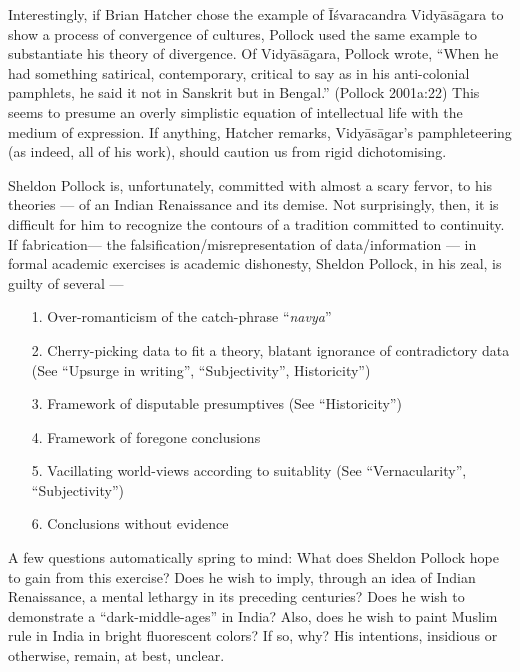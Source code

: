 Interestingly, if  Brian Hatcher chose the example of Īśvaracandra Vidyāsāgara to show a process of convergence of cultures, Pollock used the same example to substantiate his theory of divergence. Of Vidyāsāgara, Pollock wrote, “When he had something satirical, contemporary, critical to say as in his anti-colonial pamphlets, he said it not in Sanskrit but in Bengal.” (Pollock 2001a:22) This seems to presume an overly simplistic equation of intellectual life with the medium of expression. If anything, Hatcher remarks, Vidyāsāgar’s pamphleteering (as indeed, all of his work), should caution us from rigid dichotomising.
\begin{myquote}
Sheldon Pollock is, unfortunately, committed with almost a scary fervor, to his theories — of an Indian Renaissance and its demise. Not surprisingly, then, it is difficult for him to recognize the contours of a tradition committed to continuity. If fabrication— the falsification/misrepresentation of data/information —  in formal academic exercises is academic dishonesty, Sheldon Pollock, in his zeal, is guilty of several — 
\begin{itemize}
\item[1.] Over-romanticism of the catch-phrase “{\sl navya}”
\item[2.] Cherry-picking data to fit a theory, blatant ignorance of contradictory data (See “Upsurge in writing”, “Subjectivity”, Historicity”)
\item[3.] Framework of disputable presumptives (See “Historicity”)
\item[4.] Framework of foregone conclusions 
\item[5.] Vacillating world-views according to suitablity (See “Vernacularity”, “Subjectivity”)
\item[6.] Conclusions without evidence
\end{itemize}
\end{myquote}

A few questions automatically spring to mind: What does Sheldon Pollock hope to gain from this exercise? Does he wish to imply, through an idea of Indian Renaissance, a mental lethargy in its preceding centuries? Does he wish to demonstrate a “dark-middle-ages” in India? Also, does he wish to paint Muslim rule in India in bright fluorescent colors? If so, why? His intentions, insidious or otherwise, remain, at best, unclear. 

